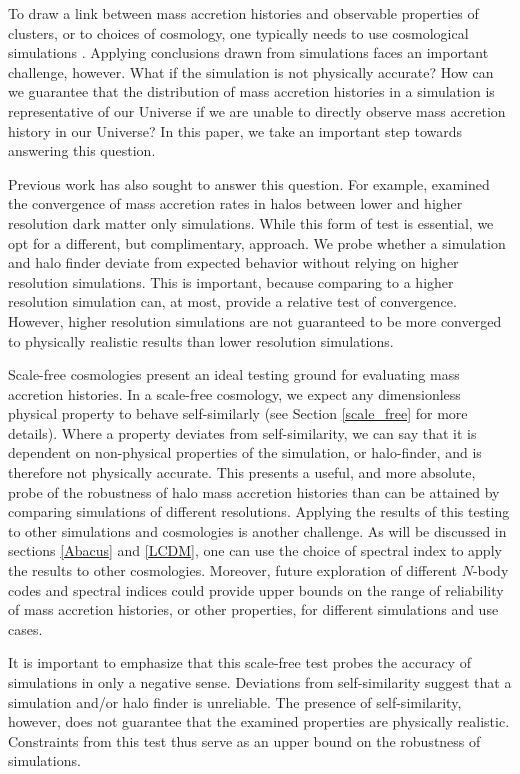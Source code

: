 To draw a link between mass accretion histories and observable properties of clusters, or to choices of cosmology, one typically needs to use cosmological simulations \cite[see][for a near exception, although $N$-body simulations were still used to inform and validate the method]{Pizzardo_2022}. Applying conclusions drawn from simulations faces an important challenge, however. What if the simulation is not physically accurate? How can we guarantee that the distribution of mass accretion histories in a simulation is representative of our Universe if we are unable to directly observe mass accretion history in our Universe? In this paper, we take an important step towards answering this question. 

Previous work has also sought to answer this question. For example, \cite{Mansfield_2021} examined the convergence of mass accretion rates in halos between lower and higher resolution dark matter only simulations. While this form of test is essential, we opt for a different, but complimentary, approach. We probe whether a simulation and halo finder deviate from expected behavior without relying on higher resolution simulations. This is important, because comparing to a higher resolution simulation can, at most, provide a relative test of convergence. However, higher resolution simulations are not guaranteed to be more converged to physically realistic results than lower resolution simulations.

Scale-free cosmologies present an ideal testing ground for evaluating mass accretion histories. In a scale-free cosmology, we expect any dimensionless physical property to behave self-similarly (see Section \ref{scale_free} for more details). Where a property deviates from self-similarity, we can say that it is dependent on non-physical properties of the simulation, or halo-finder, and is therefore not physically accurate. This presents a useful, and more absolute, probe of the robustness of halo mass accretion histories than can be attained by comparing simulations of different resolutions. Applying the results of this testing to other simulations and cosmologies is another challenge. As will be discussed in sections \ref{Abacus} and \ref{LCDM}, one can use the choice of spectral index to apply the results to other cosmologies. Moreover, future exploration of different $N$-body codes and spectral indices could provide upper bounds on the range of reliability of mass accretion histories, or other properties, for different simulations and use cases. 

It is important to emphasize that this scale-free test probes the accuracy of simulations in only a negative sense. Deviations from self-similarity suggest that a simulation and/or halo finder is unreliable. The presence of self-similarity, however, does not guarantee that the examined properties are physically realistic. Constraints from this test thus serve as an upper bound on the robustness of simulations.

